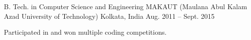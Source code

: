 

\begin{cventries}

  \cventry
    {B. Tech. in Computer Science and Engineering} %
    {MAKAUT (Maulana Abul Kalam Azad University of Technology)} %
    {Kolkata, India} %
    {Aug. 2011 – Sept. 2015} %
    {
      \begin{cvitems} %
        \item {Participated in and won multiple coding competitions.}
      \end{cvitems}
    }

\end{cventries}
